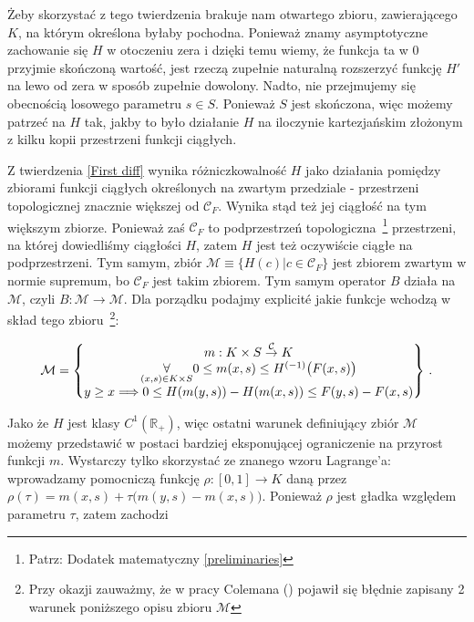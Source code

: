 Żeby skorzystać z tego twierdzenia brakuje nam otwartego zbioru, zawierającego $ K $, na którym określona byłaby pochodna. Ponieważ znamy asymptotyczne zachowanie się $ H $ w otoczeniu zera i dzięki temu wiemy, że funkcja ta w $ 0 $ przyjmie skończoną wartość, jest rzeczą zupełnie naturalną rozszerzyć funkcję $ H' $ na lewo od zera w sposób zupełnie dowolony. Nadto, nie przejmujemy się obecnością losowego parametru $ s \in S$. Ponieważ $ S $ jest skończona, więc możemy patrzeć na $ H $ tak, jakby to było działanie $H$ na iloczynie kartezjańskim złożonym z kilku kopii przestrzeni funkcji ciągłych.

Z twierdzenia \ref{First diff} wynika różniczkowalność $ H $ jako działania pomiędzy zbiorami funkcji ciągłych określonych na zwartym przedziale - przestrzeni topologicznej znacznie większej od $ \mathcal{C}_F $. Wynika stąd też jej ciągłość na tym większym zbiorze. Ponieważ zaś $ \mathcal{C}_F $ to podprzestrzeń topologiczna~\footnote{Patrz: Dodatek matematyczny \ref{preliminaries}} przestrzeni, na której dowiedliśmy ciągłości $ H $, zatem $ H $ jest też oczywiście ciągłe na podprzestrzeni. Tym samym, zbiór $ \mathcal{M} \equiv \{H(c) | c \in \mathcal{C}_F \} $ jest zbiorem zwartym w normie supremum, bo $\mathcal{C}_F $ jest takim zbiorem. Tym samym operator $ B $ działa na $ \mathcal{M} $, czyli $ B: \mathcal{M} \rightarrow \mathcal{M} $. Dla porządku podajmy explicit\'e jakie funkcje wchodzą w skład tego zbioru~\footnote{\label{dupa}Przy okazji zauważmy, że w pracy Colemana (\citeyear{Coleman2}) pojawił się błędnie zapisany 2 warunek poniższego opisu zbioru $ \mathcal{M} $}: 


\begin{equation*}
\mathcal{M}= \left \{ \begin{matrix}
m: K \times S \overset{\mathcal{C}}{\rightarrow} K \cr
 \underset{(x,s)\in K\times S}{\forall} 0 \leq m(x,s) \leq H^{(-1)}\bigl(F(x,s)\bigl) \cr
 y \geq x \Longrightarrow 0 \leq H(m(y,s))-H(m(x,s))\leq F(y,s) - F(x,s)  	\cr 
\end{matrix} \right \}\,.
\end{equation*}  

Jako że $ H $ jest klasy $ C^{1}(\mathbb{R}_{+}) $, więc ostatni warunek definiujący zbiór $ \mathcal{M} $ możemy przedstawić w postaci bardziej eksponującej ograniczenie na przyrost funkcji $ m $. Wystarczy tylko skorzystać ze znanego wzoru Lagrange'a: wprowadzamy pomocniczą funkcję $ \rho: [0,1] \rightarrow K $ daną przez $ \rho(\tau) = m(x,s) + \tau \big( m(y,s) - m(x,s) \big) $. Ponieważ $ \rho $ jest gładka względem parametru $ \tau $, zatem zachodzi


